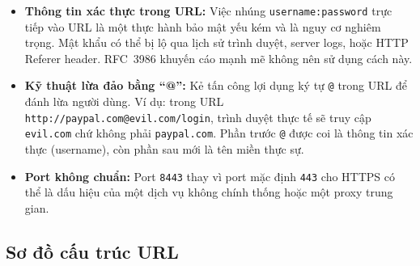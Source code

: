 \documentclass[a4paper,12pt]{article}
\begin{document}
\begin{itemize}
    \item \textbf{Thông tin xác thực trong URL:} Việc nhúng \texttt{username:password} trực tiếp vào URL là một thực hành bảo mật yếu kém và là nguy cơ nghiêm trọng. Mật khẩu có thể bị lộ qua lịch sử trình duyệt, server logs, hoặc HTTP Referer header. RFC~3986 khuyến cáo mạnh mẽ không nên sử dụng cách này.

    \item \textbf{Kỹ thuật lừa đảo bằng ``@'':} Kẻ tấn công lợi dụng ký tự \texttt{@} trong URL để đánh lừa người dùng. Ví dụ: trong URL \texttt{http://paypal.com@evil.com/login}, trình duyệt thực tế sẽ truy cập \texttt{evil.com} chứ không phải \texttt{paypal.com}. Phần trước \texttt{@} được coi là thông tin xác thực (username), còn phần sau mới là tên miền thực sự.

    \item \textbf{Port không chuẩn:} Port \texttt{8443} thay vì port mặc định \texttt{443} cho HTTPS có thể là dấu hiệu của một dịch vụ không chính thống hoặc một proxy trung gian.
\end{itemize}

\subsection{Sơ đồ cấu trúc URL}
\end{document}
